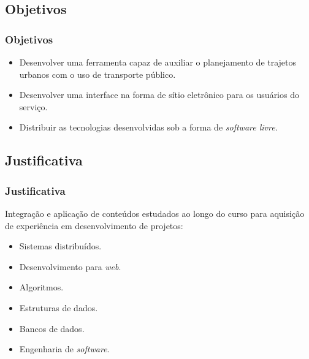 \subsection{Objetivos}
\frame
{
\frametitle{Objetivos}
	
\begin{itemize}
\item Desenvolver uma ferramenta capaz de auxiliar o planejamento de trajetos urbanos com o uso de transporte público.
\item Desenvolver uma interface na forma de sítio eletrônico para os usuários do serviço.
\item Distribuir as tecnologias desenvolvidas sob a forma de \emph{software livre}.
\end{itemize}
}

\subsection{Justificativa}
\frame
{
\frametitle{Justificativa}
Integração e aplicação de conteúdos estudados ao longo do curso para aquisição de experiência em desenvolvimento de projetos:
\begin{itemize}
	\item Sistemas distribuídos.
	\item Desenvolvimento para \emph{web}.
	\item Algoritmos.
	\item Estruturas de dados.
	\item Bancos de dados.
	\item Engenharia de \emph{software}.
\end{itemize}



}
